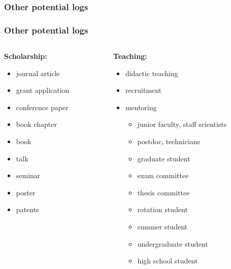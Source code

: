 \documentclass[aspectratio=169]{beamer}
\begin{document}
\subsubsection{Other potential logs}
\begin{frame}
\frametitle{Other potential logs}
\begin{columns}
    \begin{column}{0.28\textwidth}
       \large{\textbf{Scholarship:}}
        \begin{itemize}[font=$\bullet$\scshape\bfseries]
            \item journal article
            \item grant application
            \item conference paper
            \item book chapter
            \item book
            \item talk
            \item seminar
            \item poster
            \item patents
        \end{itemize}
    \end{column}
    
    \begin{column}{0.42\textwidth}
      \large{\textbf{Teaching:}}
        \begin{itemize}[font=$\bullet$\scshape\bfseries]
            \item didactic teaching
            \item recruitment
            \item mentoring
          \begin{itemize}[font=$\rightarrow$\scshape\bfseries]
            \item junior faculty, staff scientists
            \item postdoc, technicians
            \item graduate student
            \item exam committee
            \item thesis committee
            \item rotation student
            \item summer student
            \item undergraduate student
            \item high school student
          \end{itemize}
        \end{itemize}
    \end{column}
    

\end{columns}
\end{frame}
\end{document}
